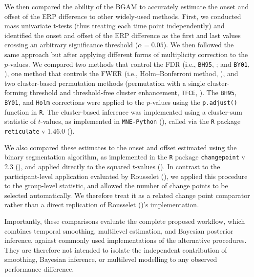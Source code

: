 \documentclass[
  doc,
  floatsintext,
  longtable,
  a4paper,
  nolmodern,
  notxfonts,
  notimes,
  colorlinks=true,linkcolor=blue,citecolor=blue,urlcolor=blue]{apa7}
\begin{document}
We then compared the ability of the BGAM to accurately estimate the
onset and offset of the ERP difference to other widely-used methods.
First, we conducted mass univariate t-tests (thus treating each time
point independently) and identified the onset and offset of the ERP
difference as the first and last values crossing an arbitrary
significance threshold (\(\alpha = 0.05\)). We then followed the same
approach but after applying different forms of multiplicity correction
to the \(p\)-values. We compared two methods that control the FDR (i.e.,
\texttt{BH95}, ; and \texttt{BY01}, ), one method that controls the FWER (i.e.,
Holm--Bonferroni method, ), and two
cluster-based permutation methods (permutation with a single
cluster-forming threshold and threshold-free cluster enhancement,
\texttt{TFCE}, ). The
\texttt{BH95}, \texttt{BY01}, and \texttt{Holm} corrections were applied
to the \(p\)-values using the \texttt{p.adjust()} function in
\texttt{R}. The cluster-based inference was implemented using a
cluster-sum statistic of \(t\)-values, as implemented in
\texttt{MNE-Python} (),
called via the \texttt{R} package \texttt{reticulate} v 1.46.0
().

We also compared these estimates to the onset and offset estimated using
the binary segmentation algorithm, as implemented in the \texttt{R}
package \texttt{changepoint} v 2.3 (), and applied directly to the squared \(t\)-values
(). In contrast to
the participant-level application evaluated by Rousselet
(), we applied this procedure
to the group-level statistic, and allowed the number of change points to
be selected automatically. We therefore treat it as a related change
point comparator rather than a direct replication of Rousselet
()'s implementation.

Importantly, these comparisons evaluate the complete proposed workflow,
which combines temporal smoothing, multilevel estimation, and Bayesian
posterior inference, against commonly used implementations of the
alternative procedures. They are therefore not intended to isolate the
independent contribution of smoothing, Bayesian inference, or multilevel
modelling to any observed performance difference.
\end{document}
